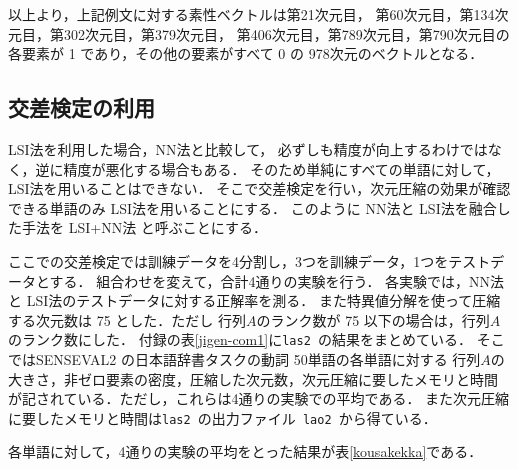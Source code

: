 以上より，上記例文に対する素性ベクトルは第21次元目，
第60次元目，第134次元目，第302次元目，第379次元目，
第406次元目，第789次元目，第790次元目の各要素が 1 であり，その他の要素がすべて 0 の
978次元のベクトルとなる．

\subsection{交差検定の利用}

LSI法を利用した場合，NN法と比較して，
必ずしも精度が向上するわけではなく，逆に精度が悪化する場合もある．
そのため単純にすべての単語に対して，LSI法を用いることはできない．
そこで交差検定を行い，次元圧縮の効果が確認できる単語のみ LSI法を用いることにする．
このように NN法と LSI法を融合した手法を LSI+NN法 と呼ぶことにする．

ここでの交差検定では訓練データを4分割し，3つを訓練データ，1つをテストデータとする．
組合わせを変えて，合計4通りの実験を行う．
各実験では，NN法と LSI法のテストデータに対する正解率を測る．
また特異値分解を使って圧縮する次元数は 75 とした．ただし
行列\( A \)のランク数が 75 以下の場合は，行列\( A \)のランク数にした．
付録の\mbox{表\ref{jigen-com1}}に{\tt las2 }の結果をまとめている．
そこではSENSEVAL2 の日本語辞書タスクの動詞 50単語の各単語に対する
行列\( A \)の大きさ，非ゼロ要素の密度，圧縮した次元数，次元圧縮に要したメモリと時間
が記されている．ただし，これらは4通りの実験での平均である．
また次元圧縮に要したメモリと時間は{\tt las2 }の出力ファイル\verb| lao2 |から得ている．

各単語に対して，4通りの実験の平均をとった結果が\mbox{表\ref{kousakekka}}である．

